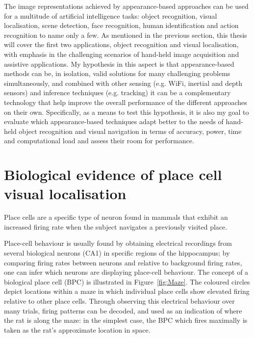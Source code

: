 The image representations achieved by appearance-based approaches can be used for a multitude of artificial intelligence tasks: object recognition, visual localisation, scene detection, face recognition, human identification and action recognition to name only a few. As mentioned in the previous section, this thesis will cover the first two applications, object recognition and visual localisation, with emphasis in the challenging scenarios of hand-held image acquisition and assistive applications. My hypothesis in this aspect is that appearance-based methods can be, in isolation, valid solutions for many challenging problems simultaneously, and combined with other sensing (e.g. WiFi, inertial and depth sensors) and inference techniques (e.g. tracking) it can be a complementary technology that help improve the overall performance of the different approaches on their own. Specifically, as a means to test this hypothesis, it is also my goal to evaluate which appearance-based techniques adapt better to the needs of hand-held object recognition and visual navigation in terms of accuracy, power, time and computational load and assess their room for performance.

\section{Biological evidence of place cell visual localisation} 

Place cells are a specific type of neuron found in mammals that exhibit an increased firing rate when the subject navigates a previously visited place.

Place-cell behaviour is usually found by obtaining electrical recordings from several biological neurons (CA1) in specific regions of the hippocampus; by comparing firing rates between neurons and relative to background firing rates, one can infer which neurons are displaying place-cell behaviour. The concept of a biological place cell (BPC) is illustrated in Figure~\ref{fig:Maze}.  The coloured circles depict locations within a maze in which individual place cells show elevated firing relative to other place cells.  Through observing this electrical behaviour over many trials, firing patterns can be decoded, and used as an indication of where the rat is along the maze: in the simplest case, the BPC which fires maximally is taken as the rat's approximate location in space. 

